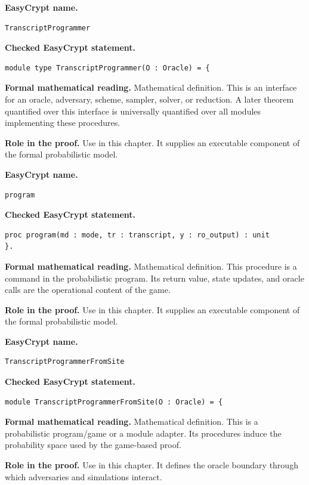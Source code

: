 \begin{formaldefinition}
\noindent\textbf{EasyCrypt name.}
\begin{lstlisting}[language=EasyCrypt,basicstyle=\ttfamily\scriptsize]
TranscriptProgrammer
\end{lstlisting}
\noindent\textbf{Checked EasyCrypt statement.}
\begin{lstlisting}[language=EasyCrypt,basicstyle=\ttfamily\scriptsize]
module type TranscriptProgrammer(O : Oracle) = {
\end{lstlisting}
\noindent\textbf{Formal mathematical reading.}
Mathematical definition. This is an interface for an oracle, adversary, scheme, sampler, solver, or reduction.  A later theorem quantified over this interface is universally quantified over all modules implementing these procedures.

\noindent\textbf{Role in the proof.}
Use in this chapter. It supplies an executable component of the formal probabilistic model.

\end{formaldefinition}

\begin{formaldefinition}
\noindent\textbf{EasyCrypt name.}
\begin{lstlisting}[language=EasyCrypt,basicstyle=\ttfamily\scriptsize]
program
\end{lstlisting}
\noindent\textbf{Checked EasyCrypt statement.}
\begin{lstlisting}[language=EasyCrypt,basicstyle=\ttfamily\scriptsize]
proc program(md : mode, tr : transcript, y : ro_output) : unit
}.
\end{lstlisting}
\noindent\textbf{Formal mathematical reading.}
Mathematical definition. This procedure is a command in the probabilistic program.  Its return value, state updates, and oracle calls are the operational content of the game.

\noindent\textbf{Role in the proof.}
Use in this chapter. It supplies an executable component of the formal probabilistic model.

\end{formaldefinition}

\begin{formaldefinition}
\noindent\textbf{EasyCrypt name.}
\begin{lstlisting}[language=EasyCrypt,basicstyle=\ttfamily\scriptsize]
TranscriptProgrammerFromSite
\end{lstlisting}
\noindent\textbf{Checked EasyCrypt statement.}
\begin{lstlisting}[language=EasyCrypt,basicstyle=\ttfamily\scriptsize]
module TranscriptProgrammerFromSite(O : Oracle) = {
\end{lstlisting}
\noindent\textbf{Formal mathematical reading.}
Mathematical definition. This is a probabilistic program/game or a module adapter.  Its procedures induce the probability space used by the game-based proof.

\noindent\textbf{Role in the proof.}
Use in this chapter. It defines the oracle boundary through which adversaries and simulations interact.

\end{formaldefinition}


